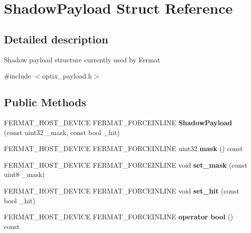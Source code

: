 \hypertarget{struct_shadow_payload}{}\section{Shadow\+Payload Struct Reference}
\label{struct_shadow_payload}


\subsection{Detailed description}
Shadow payload structure currently used by Fermat 

{\ttfamily \#include $<$optix\+\_\+payload.\+h$>$}

\subsection*{Public Methods}
\begin{DoxyCompactItemize}
\item 
\mbox{\label{struct_shadow_payload_ab6d7a0f50c7494761659028a17fc603c}} 
F\+E\+R\+M\+A\+T\+\_\+\+H\+O\+S\+T\+\_\+\+D\+E\+V\+I\+CE F\+E\+R\+M\+A\+T\+\_\+\+F\+O\+R\+C\+E\+I\+N\+L\+I\+NE {\bfseries Shadow\+Payload} (const uint32 \+\_\+mask, const bool \+\_\+hit)
\item 
\mbox{\label{struct_shadow_payload_a70a6e30eece412d4568ce71af12eee2e}} 
F\+E\+R\+M\+A\+T\+\_\+\+H\+O\+S\+T\+\_\+\+D\+E\+V\+I\+CE F\+E\+R\+M\+A\+T\+\_\+\+F\+O\+R\+C\+E\+I\+N\+L\+I\+NE uint32 {\bfseries mask} () const
\item 
\mbox{\label{struct_shadow_payload_a01953ac41518dfb5801ef90239610d41}} 
F\+E\+R\+M\+A\+T\+\_\+\+H\+O\+S\+T\+\_\+\+D\+E\+V\+I\+CE F\+E\+R\+M\+A\+T\+\_\+\+F\+O\+R\+C\+E\+I\+N\+L\+I\+NE void {\bfseries set\+\_\+mask} (const uint8 \+\_\+mask)
\item 
\mbox{\label{struct_shadow_payload_a9bd576925e86fdfa203fbcc2f03edd9e}} 
F\+E\+R\+M\+A\+T\+\_\+\+H\+O\+S\+T\+\_\+\+D\+E\+V\+I\+CE F\+E\+R\+M\+A\+T\+\_\+\+F\+O\+R\+C\+E\+I\+N\+L\+I\+NE void {\bfseries set\+\_\+hit} (const bool \+\_\+hit)
\item 
\mbox{\label{struct_shadow_payload_a025218be6f5acfee766b9ffe654e5076}} 
F\+E\+R\+M\+A\+T\+\_\+\+H\+O\+S\+T\+\_\+\+D\+E\+V\+I\+CE F\+E\+R\+M\+A\+T\+\_\+\+F\+O\+R\+C\+E\+I\+N\+L\+I\+NE {\bfseries operator bool} () const
\end{DoxyCompactItemize}
